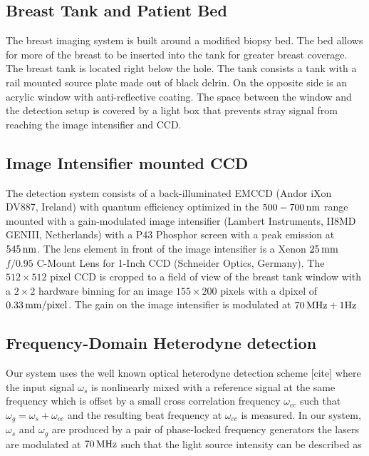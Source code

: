 \subsection{Breast Tank and Patient Bed}
The breast imaging system is built around a modified biopsy bed. The bed allows for more of the breast to be inserted into the tank for greater breast coverage. The breast tank is located right below the hole. The tank consists a tank with a rail mounted source plate made out of black delrin. On the opposite side is an acrylic window with anti-reflective coating. The space between the window and the detection setup is covered by a light box that prevents stray signal from reaching the image intensifier and CCD.


\subsection{Image Intensifier mounted CCD}
The detection system consists of a back-illuminated EMCCD (Andor iXon DV887, Ireland) with quantum efficiency optimized in the $500-700\,{\rm nm}$ range mounted with a gain-modulated image intensifier (Lambert Instruments, II8MD GENIII, Netherlands) with a P43 Phosphor screen with a peak emission at $545\, {\rm nm}$. The lens element in front of the image intensifier is a Xenon $25\,{\rm mm}$ $f/0.95$ C-Mount Lens for 1-Inch CCD (Schneider Optics, Germany). The $512 \times 512$ pixel CCD is cropped to a field of view of the breast tank window with a $2 \times 2$ hardware binning for an image $155 \times 200$ pixels with a dpixel of $0.33\, {\rm mm/pixel}$. The gain on the image intensifier is modulated at  $70\,{\rm MHz} + 1 {\rm Hz}$


\subsection{Frequency-Domain Heterodyne detection}
Our system uses the well known optical heterodyne detection scheme [cite] where the input signal $\omega_{s}$ is nonlinearly mixed with a reference signal at the same frequency which is offset by a small cross correlation frequency $\omega_{cc}$ such that $\omega_{g}=\omega_{s}+\omega_{cc}$ and the resulting beat frequency at $\omega_{cc}$ is measured.  In our system, $\omega_{s}$ and  $\omega_{g}$ are produced by a pair of phase-locked frequency generators the lasers are modulated at $70\,{\rm MHz}$ such that the light source intensity can be described as

